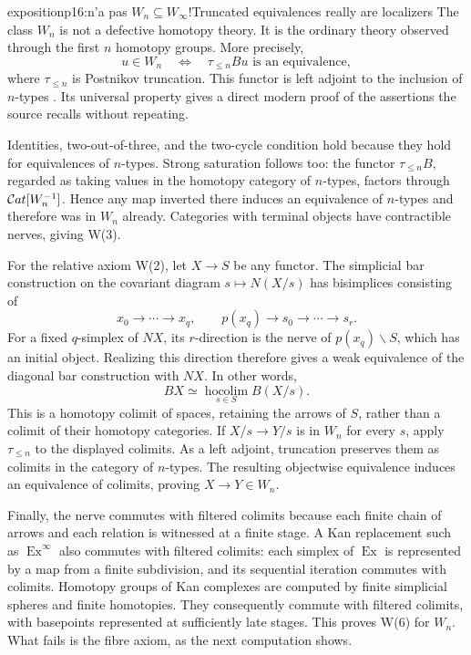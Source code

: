 \begin{dcomment}{exposition}{p16:n'a pas $W_n \subseteq W_\infty$!}{Truncated equivalences really are localizers}
The class \(W_n\) is not a defective homotopy theory. It is the ordinary theory observed through the first \(n\) homotopy groups. More precisely,
\[
  u\in W_n\quad\Longleftrightarrow\quad
  \tau_{\leq n}Bu\text{ is an equivalence},
\]
where \(\tau_{\leq n}\) is Postnikov truncation. This functor is left adjoint to the inclusion of \(n\)-types \citep[Proposition~5.5.6.18]{Lurie2009HTT}. Its universal property gives a direct modern proof of the assertions the source recalls without repeating.

Identities, two-out-of-three, and the two-cycle condition hold because they hold for equivalences of \(n\)-types. Strong saturation follows too: the functor \(\tau_{\leq n}B\), regarded as taking values in the homotopy category of \(n\)-types, factors through \(\mathcal{C}at[W_n^{-1}]\). Hence any map inverted there induces an equivalence of \(n\)-types and therefore was in \(W_n\) already. Categories with terminal objects have contractible nerves, giving W(3).

For the relative axiom W(2), let \(X\to S\) be any functor. The simplicial bar construction on the covariant diagram \(s\mapsto N(X/s)\) has bisimplices consisting of
\[
 x_0\to\cdots\to x_q,\qquad
 p(x_q)\to s_0\to\cdots\to s_r.
\]
For a fixed \(q\)-simplex of \(NX\), its \(r\)-direction is the nerve of \(p(x_q)\backslash S\), which has an initial object. Realizing this direction therefore gives a weak equivalence of the diagonal bar construction with \(NX\). In other words,
\[
 BX\simeq\operatorname*{hocolim}_{s\in S}B(X/s).
\]
This is a homotopy colimit of spaces, retaining the arrows of \(S\), rather than a colimit of their homotopy categories. If \(X/s\to Y/s\) is in \(W_n\) for every \(s\), apply \(\tau_{\leq n}\) to the displayed colimits. As a left adjoint, truncation preserves them as colimits in the category of \(n\)-types. The resulting objectwise equivalence induces an equivalence of colimits, proving \(X\to Y\in W_n\).

Finally, the nerve commutes with filtered colimits because each finite chain of arrows and each relation is witnessed at a finite stage. A Kan replacement such as \(\operatorname{Ex}^{\infty}\) also commutes with filtered colimits: each simplex of \(\operatorname{Ex}\) is represented by a map from a finite subdivision, and its sequential iteration commutes with colimits. Homotopy groups of Kan complexes are computed by finite simplicial spheres and finite homotopies. They consequently commute with filtered colimits, with basepoints represented at sufficiently late stages. This proves W(6) for \(W_n\). What fails is the fibre axiom, as the next computation shows.
\end{dcomment}


